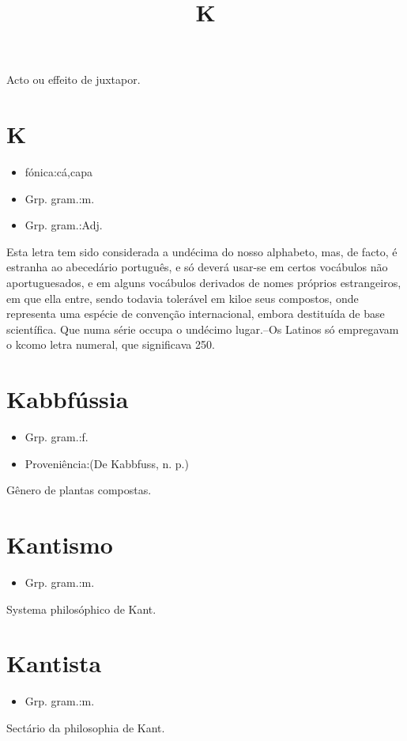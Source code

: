 \documentclass{article}
\title{K}
\begin{document}
Acto ou effeito de juxtapor.
\section{K}
\begin{itemize}
\item {fónica:cá,capa}
\end{itemize}
\begin{itemize}
\item {Grp. gram.:m.}
\end{itemize}
\begin{itemize}
\item {Grp. gram.:Adj.}
\end{itemize}
Esta letra tem sido considerada a undécima do nosso alphabeto, mas, de facto, é estranha ao abecedário português, e só deverá usar-se em certos vocábulos não aportuguesados, e em alguns vocábulos derivados de nomes próprios estrangeiros, em que ella entre, sendo todavia tolerável em \textunderscore kilo\textunderscore  e seus compostos, onde representa uma espécie de convenção internacional, embora destituída de base scientífica.
Que numa série occupa o undécimo lugar.--Os Latinos só empregavam o \textunderscore k\textunderscore  como letra numeral, que significava 250.
\section{Kabbfússia}
\begin{itemize}
\item {Grp. gram.:f.}
\end{itemize}
\begin{itemize}
\item {Proveniência:(De \textunderscore Kabbfuss\textunderscore , n. p.)}
\end{itemize}
Gênero de plantas compostas.
\section{Kantismo}
\begin{itemize}
\item {Grp. gram.:m.}
\end{itemize}
Systema philosóphico de Kant.
\section{Kantista}
\begin{itemize}
\item {Grp. gram.:m.}
\end{itemize}
Sectário da philosophia de Kant.
\end{document}
